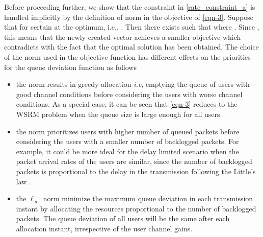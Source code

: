 Before proceeding further, we show that the constraint in \eqref{rate_constraint_a} is handled implicitly by the definition of  norm in the objective of \eqref{eqn-3}. Suppose that  for certain  at the optimum, i.e., . Then there exists  such that  where . Since , this means that the newly created vector  achieves a smaller objective which contradicts with the fact that the optimal solution has been obtained. The choice of the  norm used in the objective function \cite{berry2004cross,qps_cioffi} has different effects on the priorities for the queue deviation function as follows
\begin{itemize}
\item the  norm results in greedy allocation \textit{i.e}, emptying the queue of users with good channel conditions before considering the users with worse channel conditions. As a special case, it can be seen that \eqref{eqn-3} reduces to the \ac{WSRM} problem when the queue size is large enough for all users.
\item the  norm prioritizes users with higher number of queued packets before considering the users with a smaller number of backlogged packets. For example, it could be more ideal for the delay limited scenario when the packet arrival rates of the users are similar, since the number of backlogged packets is proportional to the delay in the transmission following the Little's law \cite{neely2010stochastic}.
\item the \(\ell_{\infty} \) norm minimize the maximum queue deviation in each transmission instant by allocating the resources proportional to the number of backlogged packets. The queue deviation of all users will be the same after each allocation instant, irrespective of the user channel gains.
\end{itemize} 